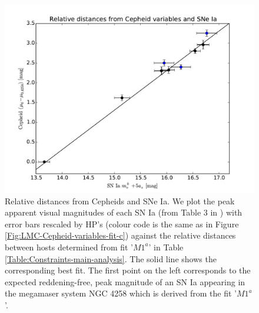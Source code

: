 \begin{figure}[hbtp]
\centering
\includegraphics[scale=0.75]{figures/chapter-h0/effective_HP_SNIa.pdf}
\caption{Relative distances from Cepheids and SNe Ia. We plot the peak apparent visual magnitudes of each SN Ia (from Table 3 in \cite{Riess:2011yx}) with error bars rescaled by HP's (colour code is the same as in Figure \ref{Fig:LMC-Cepheid-variables-fit-c}) against the relative distances between hosts determined from fit '$M1^a$' in Table \ref{Table:Constraints-main-analysis}. The solid line shows the corresponding best fit. The first point on the left corresponds to the expected reddening-free, peak magnitude of an SN Ia appearing in the megamaser system NGC 4258 which is derived from the fit '$M1^a$'. }
\label{Fig:HP-SNIa-main-analysis}
\end{figure}

